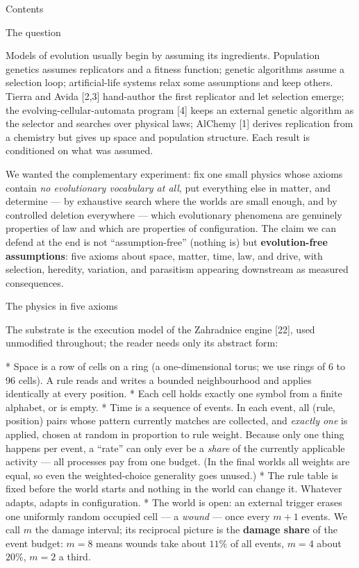 \bigskip
{\nonum\notoc\sec Contents}
\maketoc
\bigskip

\sec The question

Models of evolution usually begin by assuming its ingredients.
Population genetics assumes replicators and a fitness function;
genetic algorithms assume a selection loop; artificial-life systems
relax some assumptions and keep others. Tierra and Avida [2,3]
hand-author the first replicator and let selection emerge; the
evolving-cellular-automata program [4] keeps an external genetic
algorithm as the selector and searches over physical laws; AlChemy
[1] derives replication from a chemistry but gives up space and
population structure. Each result is conditioned on what was
assumed.

We wanted the complementary experiment: fix one small physics whose
axioms contain {\it no evolutionary vocabulary at all}, put
everything else in matter, and determine --- by exhaustive search
where the worlds are small enough, and by controlled deletion
everywhere --- which evolutionary phenomena are genuinely properties
of law and which are properties of configuration. The claim we can
defend at the end is not “assumption-free” (nothing is) but
{\bf evolution-free assumptions}: five axioms about space, matter,
time, law, and drive, with selection, heredity, variation, and
parasitism appearing downstream as measured consequences.

\sec The physics in five axioms

The substrate is the execution model of the Zahradnice engine [22],
used unmodified throughout; the reader needs only its abstract
form:

\begitems
*  Space is a row of cells on a ring (a
one-dimensional torus; we use rings of 6 to 96 cells). A rule reads
and writes a bounded neighbourhood and applies identically at every
position.
*  Each cell holds exactly one symbol from a
finite alphabet, or is empty.
*  Time is a sequence of events. In
each event, all (rule, position) pairs whose pattern currently
matches are collected, and {\it exactly one} is applied, chosen at
random in proportion to rule weight. Because only one thing happens
per event, a “rate” can only ever be a {\it share} of the
currently applicable activity --- all processes pay from one budget.
(In the final worlds all weights are equal, so even the
weighted-choice generality goes unused.)
*  The rule table is fixed before the world
starts and nothing in the world can change it. Whatever adapts,
adapts in configuration.
*  The world is open: an external trigger erases
one uniformly random occupied cell --- a {\it wound} --- once every
$m{+}1$ events. We call $m$ the damage interval; its reciprocal
picture is the {\bf damage share} of the event budget: $m{=}8$
means wounds take about $11\%$ of all events, $m{=}4$ about
$20\%$, $m{=}2$ a third.
\enditems

